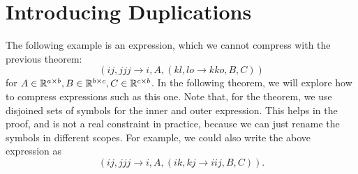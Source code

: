 \section{Introducing Duplications}

The following example is an expression, which we cannot compress with the previous theorem:
$$(ij, jjj \rightarrow i, A, (kl, lo \rightarrow kko, B, C))$$
for $A \in \mathbb{R}^{a \times b}, B \in \mathbb{R}^{b \times c}, C \in \mathbb{R}^{c \times b}$.
In the following theorem, we will explore how to compress expressions such as this one.
Note that, for the theorem, we use disjoined sets of symbols for the inner and outer expression.
This helps in the proof, and is not a real constraint in practice,
because we can just rename the symbols in different scopes.
For example, we could also write the above expression as
$$(ij, jjj \rightarrow i, A, (ik, kj \rightarrow iij, B, C)).$$

